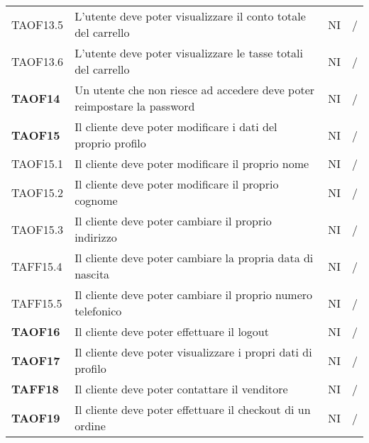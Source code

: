 \begin{center}
\begin{longtable}[!h]{p{60px} p{240px} p{35px} p{35px}}
        TAOF13.5        & L'utente deve poter visualizzare il conto totale del carrello                                       & NI             & /              \\
        TAOF13.6        & L'utente deve poter visualizzare le tasse totali del carrello                                       & NI             & /              \\
        \textbf{TAOF14} & Un utente che non riesce ad accedere deve poter reimpostare la password                             & NI             & /              \\
        \textbf{TAOF15} & Il cliente deve poter modificare i dati del proprio profilo                                         & NI             & /              \\
        TAOF15.1        & Il cliente deve poter modificare il proprio nome                                                    & NI             & /              \\
        TAOF15.2        & Il cliente deve poter modificare il proprio cognome                                                 & NI             & /              \\
        TAOF15.3        & Il cliente deve poter cambiare il proprio indirizzo                                                 & NI             & /              \\
        TAFF15.4        & Il cliente deve poter cambiare la propria data di nascita                                           & NI             & /              \\
        TAFF15.5        & Il cliente deve poter cambiare il proprio numero telefonico                                         & NI             & /              \\
        \textbf{TAOF16} & Il cliente deve poter effettuare il logout                                                          & NI             & /              \\
        \textbf{TAOF17} & Il cliente deve poter visualizzare i propri dati di profilo                                         & NI             & /              \\
        \textbf{TAFF18} & Il cliente deve poter contattare il venditore                                                       & NI             & /              \\
        \textbf{TAOF19} & Il cliente deve poter effettuare il checkout di un ordine                                           & NI             & /              \\

\end{longtable}
\end{center}
